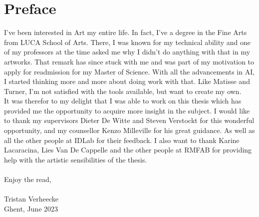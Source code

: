 \chapter*{Preface}

I've been interested in Art my entire life. In fact, I've a degree in the Fine Arts from LUCA School of Arts.
There, I was known for my technical ability and one of my professors at the time asked me why I didn't do anything with that in my artworks.
That remark has since stuck with me and was part of my motivation to apply for readmission for my Master of Science.
With all the advancements in AI, I started thinking more and more about doing work with that.
Like Matisse and Turner, I'm not satisfied with the tools available, but want to create my own.
\\

It was therefor to my delight that I was able to work on this thesis which has provided me the opportunity to acquire more insight in the subject.
I would like to thank my supervisors Dieter De Witte and Steven Verstockt for this wonderful opportunity,
and my counsellor Kenzo Milleville for his great guidance. As well as all the other people at IDLab for their feedback.
I also want to thank Karine Lacaracina, Lies Van De Cappelle and the other people at RMFAB for providing help with the artistic sensibilities of the thesis.
\\
\\
Enjoy the read,
\\
\\
Tristan Verheecke\\
Ghent, June 2023